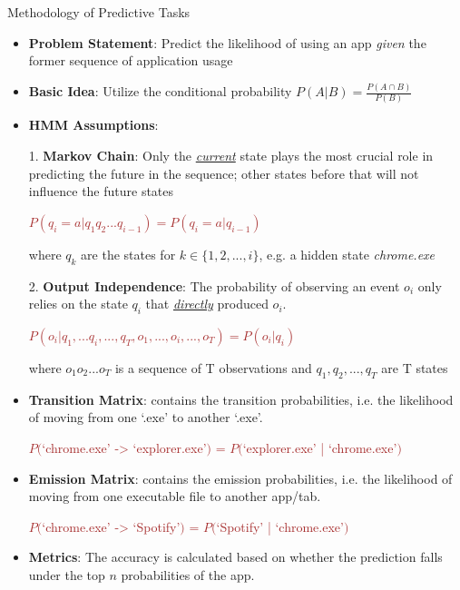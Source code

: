 \documentclass[final]{beamer}
\newlength{\colwidth}
\begin{document}
\begin{frame}[t]
\begin{columns}[t]
\begin{column}{\colwidth}
\begin{exampleblock}{\LARGE{Methodology of Predictive Tasks}}
{          \begin{itemize}
            \item \textbf{Problem Statement}: Predict the likelihood of using an app \textit{given} the former sequence of application usage
            \item \textbf{Basic Idea}: Utilize the conditional probability $P(A|B) = \frac{P(A\cap B)}{P(B)}$
            \item \textbf{HMM Assumptions}:

                  1. \textbf{Markov Chain}: Only the \underline{\textit{current}} state plays the most crucial role in predicting the future in the sequence; other states before that will not influence the future states
\\
                  {\centering \textcolor{brown}{$P(q_i = a | q_1q_2...q_{i-1}) = P(q_i= a | q_{i-1})$} \par}

                  where $q_k$ are the states for $k \in \{1, 2, ..., i\}$, e.g. a hidden state \textit{chrome.exe}

                  2. \textbf{Output Independence}: The probability of observing an event $o_i$ only relies on the state $q_i$ that \underline{\textit{directly}} produced $o_i$.
\\
                    {\centering \textcolor{brown}{$P(o_i | q_1, ... q_i , ..., q_T, o_1, ..., o_i, ..., o_T) = P(o_i | q_i)$} \par}

                  where $o_1o_2...o_T$ is a sequence of T observations and $q_1, q_2 , ...,q_T$ are T states

            \item \textbf{Transition Matrix}: contains the transition probabilities, i.e. the likelihood of moving from one `.exe' to another `.exe'. \\
                  {\centering \textcolor{brown}{$P($`chrome.exe' -> `explorer.exe'$)$ =  $P($`explorer.exe' | `chrome.exe'$)$} \par}

            \item \textbf{Emission Matrix}: contains the emission probabilities, i.e. the likelihood of moving from one executable file to another app/tab.\\
                  {\centering \textcolor{brown}{$P($`chrome.exe' -> `Spotify'$)$ =  $P($`Spotify' | `chrome.exe'$)$} \par}
            \item \textbf{Metrics}: The accuracy is calculated based on whether the prediction falls under the top $n$ probabilities of the app.
          \end{itemize}

}
\end{exampleblock}
\end{column}
\end{columns}
\end{frame}
\end{document}
